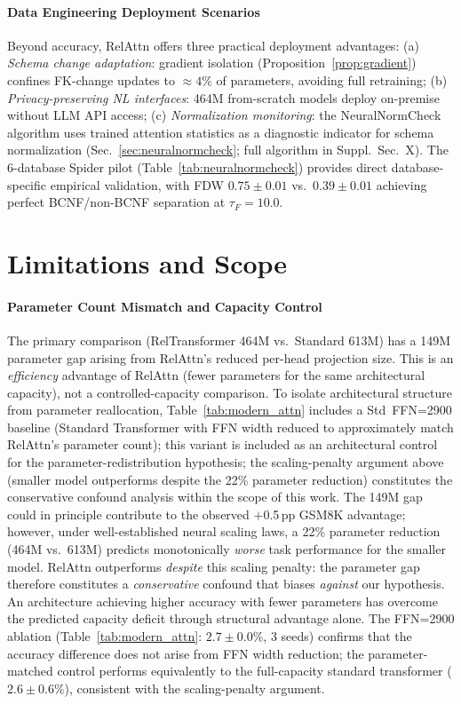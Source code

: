 \documentclass[conference]{IEEEtran}
\begin{document}
\paragraph{Data Engineering Deployment Scenarios}
Beyond accuracy, RelAttn offers three practical deployment advantages: (a) \emph{Schema change adaptation}: gradient isolation (Proposition~\ref{prop:gradient}) confines FK-change updates to ${\approx}4\%$ of parameters, avoiding full retraining; (b) \emph{Privacy-preserving NL interfaces}: 464M from-scratch models deploy on-premise without LLM API access; (c) \emph{Normalization monitoring}: the NeuralNormCheck algorithm uses trained attention statistics as a diagnostic indicator for schema normalization (Sec.~\ref{sec:neuralnormcheck}; full algorithm in Suppl.\ Sec.~X). The 6-database Spider pilot (Table~\ref{tab:neuralnormcheck}) provides direct database-specific empirical validation, with FDW $0.75{\pm}0.01$ vs.\ $0.39{\pm}0.01$ achieving perfect BCNF/non-BCNF separation at $\tau_F{=}10.0$.


\section{Limitations and Scope}

\paragraph{Parameter Count Mismatch and Capacity Control}
The primary comparison (RelTransformer 464M vs.\ Standard 613M) has a 149M parameter gap arising from RelAttn's reduced per-head projection size. This is an \emph{efficiency} advantage of RelAttn (fewer parameters for the same architectural capacity), not a controlled-capacity comparison. To isolate architectural structure from parameter reallocation, Table~\ref{tab:modern_attn} includes a Std~FFN=2900 baseline (Standard Transformer with FFN width reduced to approximately match RelAttn's parameter count); this variant is included as an architectural control for the parameter-redistribution hypothesis; the scaling-penalty argument above (smaller model outperforms despite the 22\% parameter reduction) constitutes the conservative confound analysis within the scope of this work. The 149M gap could in principle contribute to the observed $+$0.5\,pp GSM8K advantage; however, under well-established neural scaling laws, a 22\% parameter reduction (464M vs.\ 613M) predicts monotonically \emph{worse} task performance for the smaller model. RelAttn outperforms \emph{despite} this scaling penalty: the parameter gap therefore constitutes a \emph{conservative} confound that biases \emph{against} our hypothesis. An architecture achieving higher accuracy with fewer parameters has overcome the predicted capacity deficit through structural advantage alone. The FFN=2900 ablation (Table~\ref{tab:modern_attn}: $2.7{\pm}0.0\%$, 3 seeds) confirms that the accuracy difference does not arise from FFN width reduction; the parameter-matched control performs equivalently to the full-capacity standard transformer ($2.6{\pm}0.6\%$), consistent with the scaling-penalty argument.
\end{document}
